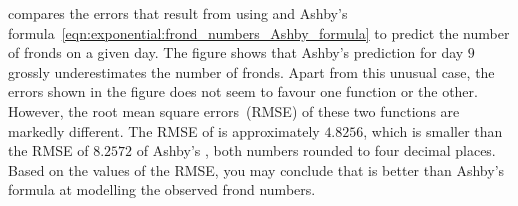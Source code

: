 \documentclass[a4paper,oneside,12pt]{article}
\begin{document}
\begin{problem}
{\begin{solution}
 compares the errors that
result from using
 and
Ashby's formula~\eqref{eqn:exponential:frond_numbers_Ashby_formula} to
predict the number of fronds on a given day.  The figure shows that
Ashby's prediction for day $9$ grossly underestimates the number of
fronds.  Apart from this unusual case, the errors shown in the figure
does not seem to favour one function or the other.  However, the root
mean square errors~(RMSE) of these two functions are markedly
different.  The RMSE of
 is
approximately $4.8256$, which is smaller than the RMSE of $8.2572$ of
Ashby's , both
numbers rounded to four decimal places.  Based on the values of the
RMSE, you may conclude that
 is
better than Ashby's formula at modelling the observed frond numbers.
\end{solution}
}{}


\end{problem}
\end{document}
